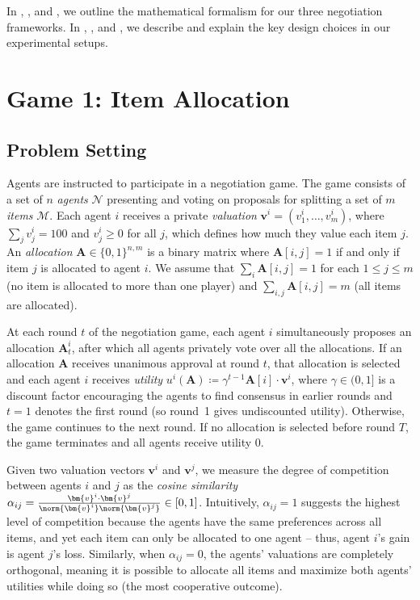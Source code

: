 In , , and , we outline the mathematical formalism for our three negotiation frameworks. In , , and , we describe and explain the key design choices in our experimental setups.

\section{Game 1: Item Allocation}

\subsection{Problem Setting}
\label{sec:game_1_problem_setting}

Agents are instructed to participate in a negotiation game.
The game consists of a set of $n$ \emph{agents} $\mathcal{N}$ presenting and voting on proposals for splitting a set of $m$ \emph{items} $\mathcal{M}$.
Each agent $i$ receives a private \emph{valuation} $\bm{v}^{i} = ( v^{i}_{1} , \dots,  v^{i}_{m} )$, where $\sum_j v^{i}_{j} = 100$ and $v^{i}_{j} \geq 0$ for all $j$, which defines how much they value each item $j$.
An \emph{allocation} $\bm{A} \in \{0,1\}^{n,m}$ is a binary matrix where $\bm{A}[i,j] = 1$ if and only if item $j$ is allocated to agent $i$.
We assume that $\sum_i \bm{A}[i,j] = 1$ for each $1 \leq j \leq m$ (no item is allocated to more than one player) and $\sum_{i,j} \bm{A}[i,j] = m$ (all items are allocated).

At each round $t$ of the negotiation game, each agent $i$ simultaneously proposes an allocation $\bm{A}^i_t$, after which all agents privately vote over all the allocations.
If an allocation $\bm{A}$ receives unanimous approval at round $t$, that allocation is selected and each agent $i$ receives \emph{utility} $u^i(\bm{A}) \coloneqq \gamma^{t-1} \bm{A}[i] \cdot \bm{v}^{i}$, where $\gamma \in (0,1]$ is a discount factor encouraging the agents to find consensus in earlier rounds and $t=1$ denotes the first round (so round~1 gives undiscounted utility).
Otherwise, the game continues to the next round.
If no allocation is selected before round $T$, the game terminates and all agents receive utility 0.

Given two valuation vectors $\bm{v}^i$ and $\bm{v}^j$, we measure the degree of competition between agents $i$ and $j$ as the \emph{cosine similarity} $\alpha_{ij} = \frac{{\bm{v}^i} \cdot \bm{v}^j}{\norm{\bm{v}^i} \norm{\bm{v}^j}} \in [0,1]$.
Intuitively, $\alpha_{ij} = 1$ suggests the highest level of competition because the agents have the same preferences across all items, and yet each item can only be allocated to one agent -- thus, agent $i$'s gain is agent $j$'s loss.
Similarly, when $\alpha_{ij} = 0$, the agents' valuations are completely orthogonal, meaning it is possible to allocate all items and maximize both agents' utilities while doing so (the most cooperative outcome).


